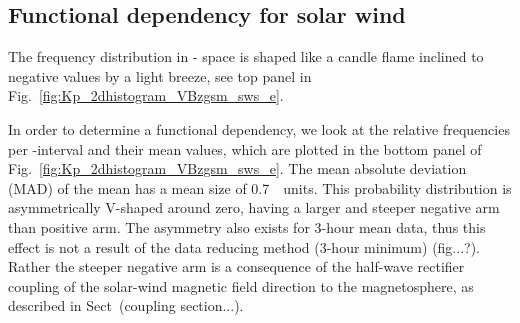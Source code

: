 \subsection{Functional dependency for solar wind}
The frequency distribution in \Kp-\vBz{} space is shaped like a candle flame inclined to negative values by a light breeze, see top panel in Fig.~\ref{fig:Kp_2dhistogram_VBzgsm_sws_e}.
\begin{figure}
\end{figure}
In order to determine a functional dependency, we look at the relative frequencies per \vBz-interval and their mean \Kp{} values, which are plotted in the bottom panel of Fig.~\ref{fig:Kp_2dhistogram_VBzgsm_sws_e}. The mean absolute deviation (MAD) of the mean has a mean size of \SI{0.7}{\Kp~units}. This probability distribution is asymmetrically V-shaped around zero, having a larger and steeper negative arm than positive arm. The asymmetry also exists for 3-hour mean data, thus this effect is not a result of the data reducing method (3-hour minimum) (fig...?). Rather the steeper negative arm is a consequence of the half-wave rectifier coupling of the solar-wind magnetic field direction to the magnetosphere, as described in Sect~(coupling section...).\\

